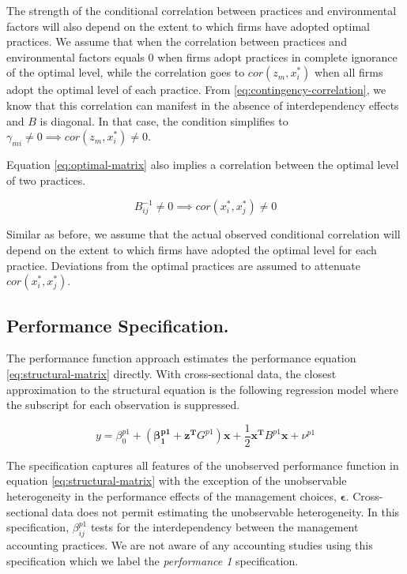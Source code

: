 \documentclass[12pt]{article}
\begin{document}
The strength of the conditional correlation between practices and environmental factors will also depend on the extent to which firms have adopted optimal practices. We assume that when the correlation between practices and environmental factors equals $0$ when firms adopt practices in complete ignorance of the optimal level, while the correlation goes to $cor(z_m, x^*_i)$ when all firms adopt the optimal level of each practice. From \eqref{eq:contingency-correlation}, we know that this correlation can manifest in the absence of interdependency effects and $B$ is diagonal. In that case, the condition simplifies to $\gamma_{mi} \neq 0 \implies cor(z_m, x^*_i) \neq 0$. 

Equation \eqref{eq:optimal-matrix} also implies a correlation between the optimal level of two practices.

\begin{equation} \label{eq:interdependency-correlation}
    B^{-1}_{ij} \neq 0 \implies cor(x^*_i, x^*_j) \neq 0
\end{equation}

Similar as before, we assume that the actual observed conditional correlation will depend on the extent to which firms have adopted the optimal level for each practice. Deviations from the optimal practices are assumed to attenuate $cor(x^*_i, x^*_j)$. 

\subsection{Performance Specification.}\label{the-performance-specification.}

The performance function approach estimates the performance equation \eqref{eq:structural-matrix} directly. With cross-sectional data, the closest approximation to the structural equation is the following regression model where the subscript for each observation is suppressed. 

\begin{equation*}
    y = \beta_0^{p1} + (\mathbf{\beta_1^{p1}} + \mathbf{z^T} G^{p1}) \mathbf{x} + 
    \frac{1}{2}\mathbf{x^T} B^{p1} \mathbf{x} + \nu^{p1}
\end{equation*}

The specification captures all features of the unobserved performance function in equation \eqref{eq:structural-matrix} with the exception of the unobservable heterogeneity in the performance effects of the management choices, $\mathbf{\epsilon}$. Cross-sectional data does not permit estimating the unobservable heterogeneity. In this specification, \(\beta_{ij}^{p1}\) tests for the interdependency between the management accounting practices. We are not aware of any accounting studies using this specification which we label the \emph{performance 1} specification. 
\end{document}
